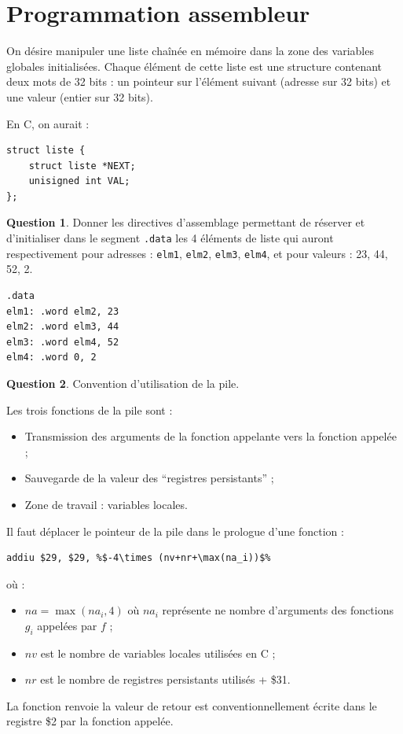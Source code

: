 \documentclass[11pt,english,french]{scrreprt}
\theoremstyle{remark}
\theoremstyle{definition}
\newtheorem{ques}{Question}[section]
\begin{document}
\clearpage

\section{Programmation assembleur} %

On désire manipuler une liste chaînée en mémoire dans la zone des variables globales initialisées. Chaque élément de cette liste est une structure contenant deux mots de 32 bits : un pointeur sur l'élément suivant (adresse sur 32 bits) et une valeur (entier sur 32 bits). 

En C, on aurait :
\begin{lstlisting}
struct liste {
	struct liste *NEXT;
	unisigned int VAL;
};
\end{lstlisting}

\begin{ques}
	Donner les directives d'assemblage permettant de réserver et d'initialiser dans le segment \lstinline!.data! les 4 éléments de liste qui auront respectivement pour adresses : \lstinline!elm1!, \lstinline!elm2!, \lstinline!elm3!, \lstinline!elm4!, et pour valeurs : 23, 44, 52, 2.
	
\begin{lstlisting}
.data
elm1: .word elm2, 23
elm2: .word elm3, 44
elm3: .word elm4, 52
elm4: .word 0, 2
\end{lstlisting}
\end{ques}

\begin{ques}
	Convention d'utilisation de la pile.
	
	Les trois fonctions de la pile sont : \begin{itemize}
		\item Transmission des arguments de la fonction appelante vers la fonction appelée ;
		\item Sauvegarde de la valeur des ``registres persistants'' ;
		\item Zone de travail : variables locales.
	\end{itemize}
	
	Il faut déplacer le pointeur de la pile dans le prologue d'une fonction :
\vspace{-5pt}
\begin{lstlisting}[escapechar=\%]
addiu $29, $29, %$-4\times (nv+nr+\max(na_i))$%
\end{lstlisting}
\vspace{-10pt}
où :\begin{itemize}
	\item $na = \max(na_i, 4)$ où $na_i$ représente ne nombre d’arguments des fonctions $g_i$ appelées par $f$ ;
	\item $nv$ est le nombre de variables locales utilisées en C ;
	\item $nr$ est le nombre de registres persistants utilisés + \$31.
\end{itemize}

La fonction renvoie la valeur de retour est conventionnellement écrite dans le registre \$2 par la fonction appelée.
\end{ques}
\end{document}
